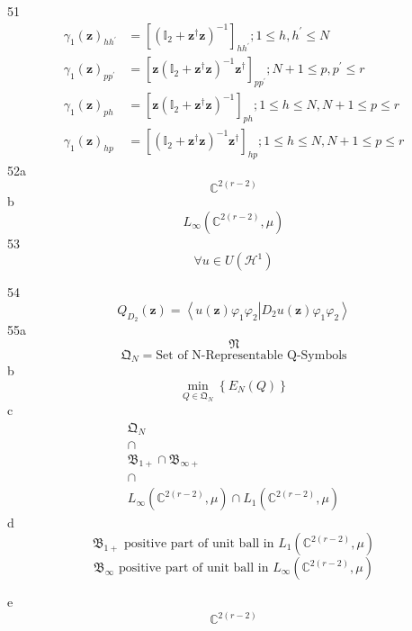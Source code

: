 \documentclass[aps,preprint]{revtex4}%
\begin{document}
51%
\begin{align*}
\gamma_{1}\left(  \mathbf{z}\right)  _{hh^{\prime}} &  =\left[  \left(
\mathbb{I}_{2}+\mathbf{z}^{\dagger}\mathbf{z}\right)  ^{-1}\right]
_{hh^{\prime}};1\leq h,h^{\prime}\leq N\\
\gamma_{1}\left(  \mathbf{z}\right)  _{pp^{\prime}} &  =\left[  \mathbf{z}%
\left(  \mathbb{I}_{2}+\mathbf{z}^{\dagger}\mathbf{z}\right)  ^{-1}%
\mathbf{z}^{\dagger}\right]  _{pp^{\prime}};N+1\leq p,p^{\prime}\leq r\\
\gamma_{1}\left(  \mathbf{z}\right)  _{ph} &  =\left[  \mathbf{z}\left(
\mathbb{I}_{2}+\mathbf{z}^{\dagger}\mathbf{z}\right)  ^{-1}\right]
_{ph};1\leq h\leq N,N+1\leq p\leq r\\
\gamma_{1}\left(  \mathbf{z}\right)  _{hp} &  =\left[  \left(  \mathbb{I}%
_{2}+\mathbf{z}^{\dagger}\mathbf{z}\right)  ^{-1}\mathbf{z}^{\dagger}\right]
_{hp};1\leq h\leq N,N+1\leq p\leq r
\end{align*}
52a%
\[
\mathbb{C}^{2\left(  r-2\right)  }%
\]
b%
\[
L_{\infty}\left(  \mathbb{C}^{2\left(  r-2\right)  },\mu\right)
\]
53%
\[
\forall u\in U\left(  \mathcal{H}^{1}\right)
\]


54
\[
Q_{D_{2}}\left(  \mathbf{z}\right)  =\left\langle u\left(  \mathbf{z}\right)
\varphi_{1}\varphi_{2}\left\vert D_{2}u\left(  \mathbf{z}\right)  \varphi
_{1}\varphi_{2}\right.  \right\rangle
\]
55a%
\[
\mathfrak{N}%
\]%
\[
\mathfrak{Q}_{N}=\text{Set of N-Representable Q-Symbols}%
\]
b%
\[
\min_{Q\in\mathfrak{Q}_{N}}\left\{  E_{N}\left(  Q\right)  \right\}
\]
c%
\begin{gather*}
\mathfrak{Q}_{N}\\
\cap\\
\mathfrak{B}_{1+}\cap\mathfrak{B}_{\infty+}\\
\cap\\
L_{\infty}\left(  \mathbb{C}^{2\left(  r-2\right)  },\mu\right)  \cap
L_{1}\left(  \mathbb{C}^{2\left(  r-2\right)  },\mu\right)
\end{gather*}
d%
\[
\mathfrak{B}_{1+}\text{ positive part of unit ball in }L_{1}\left(
\mathbb{C}^{2\left(  r-2\right)  },\mu\right)
\]%
\[
\mathfrak{B}_{\infty}\text{ positive part of unit ball in }L_{\infty}\left(
\mathbb{C}^{2\left(  r-2\right)  },\mu\right)
\]


e
\[
\mathbb{C}^{2\left(  r-2\right)  }%
\]
\bigskip

\end{document}
